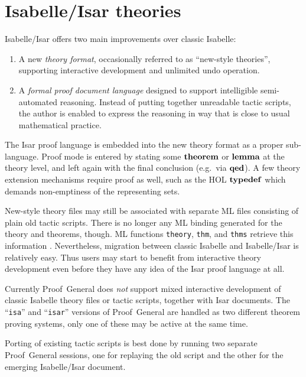 \section{Isabelle/Isar theories}

Isabelle/Isar offers two main improvements over classic Isabelle:
\begin{enumerate}
\item A new \emph{theory format}, occasionally referred to as ``new-style
  theories'', supporting interactive development and unlimited undo operation.
\item A \emph{formal proof document language} designed to support intelligible
  semi-automated reasoning.  Instead of putting together unreadable tactic
  scripts, the author is enabled to express the reasoning in way that is close
  to usual mathematical practice.
\end{enumerate}

The Isar proof language is embedded into the new theory format as a proper
sub-language.  Proof mode is entered by stating some ${\mathord{\mathbf{theorem}}}$ or
${\mathord{\mathbf{lemma}}}$ at the theory level, and left again with the final conclusion
(e.g.\ via ${\mathord{\mathbf{qed}}}$).  A few theory extension mechanisms require proof as
well, such as the HOL ${\mathord{\mathbf{typedef}}}$ which demands non-emptiness of
the representing sets.

New-style theory files may still be associated with separate ML files
consisting of plain old tactic scripts.  There is no longer any ML binding
generated for the theory and theorems, though.  ML functions \texttt{theory},
\texttt{thm}, and \texttt{thms} retrieve this information \cite{isabelle-ref}.
Nevertheless, migration between classic Isabelle and Isabelle/Isar is
relatively easy.  Thus users may start to benefit from interactive theory
development even before they have any idea of the Isar proof language at all.

\begin{warn}
  Currently Proof~General does \emph{not} support mixed interactive
  development of classic Isabelle theory files or tactic scripts, together
  with Isar documents.  The ``\texttt{isa}'' and ``\texttt{isar}'' versions of
  Proof~General are handled as two different theorem proving systems, only one
  of these may be active at the same time.
\end{warn}

Porting of existing tactic scripts is best done by running two separate
Proof~General sessions, one for replaying the old script and the other for the
emerging Isabelle/Isar document.


